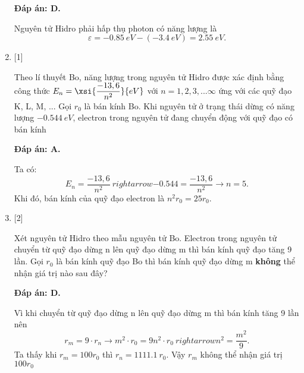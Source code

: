 \begin{enumerate}[label=\bfseries Câu \arabic*:]
	\loigiai
	{		\textbf{Đáp án: D.}
		
		Nguyên tử Hidro phải hấp thụ photon có năng lượng là
		$$
		\varepsilon = \SI{-0,85}{eV} - \left( \SI{-3,4}{eV} \right) = \SI{2,55}{eV}.
		$$	
	}
	
	\item {} [1]
		\cauhoi
	{Theo lí thuyết Bo, năng lượng trong nguyên tử Hidro được xác định bằng công thức $ E_{n} = \xsi{\dfrac{-13,6}{n^{2}}}{eV}$ với $ n = 1, 2, 3, ...\infty $ ứng với các quỹ đạo K, L, M, ... Gọi $ r_{0} $ là bán kính Bo. Khi nguyên tử ở trạng thái dừng có năng lượng $ \SI{-0,544}{eV} $, electron trong nguyên tử đang chuyển động với quỹ đạo có bán kính
	}
	
	\loigiai
	{		\textbf{Đáp án: A.}
		
		Ta có:
		$$
		E_{n} = \dfrac{-13,6}{n^{2}} \ rightarrow \num{-0,544} = \dfrac{-13,6}{n^{2}} \rightarrow n = 5.
		$$		
		Khi đó, bán kính của quỹ đạo electron là $ n^{2} r_{0} = 25 r_{0}$.
	}
	
	\item {} [2]
		\cauhoi
	{Xét nguyên tử Hidro theo mẫu nguyên tử Bo. Electron trong nguyên tử chuyển từ quỹ đạo dừng n lên quỹ đạo dừng m thì bán kính quỹ đạo tăng 9 lần. Gọi $ r_{0} $ là bán kính quỹ đạo Bo thì bán kính quỹ đạo dừng m \textbf{không} thể nhận giá trị nào sau đây?
	}
	
	\loigiai
	{		\textbf{Đáp án: D.}
		
		Vì khi chuyển từ quỹ đạo dừng n lên quỹ đạo dừng m thì bán kính tăng 9 lần nên
		$$
		r_{m} = 9 \cdot r_{n} \rightarrow m^{2} \cdot r_{0} = 9 n^{2} \cdot r_{0} \ rightarrow n^{2} = \dfrac{m^{2}}{9}.
		$$		
		Ta thấy khi $ r_{m} = 100 r_{0} $ thì $ r_{n} = \SI{1111,1}{r_{0}}$.
		Vậy $ r_{m} $ không thể nhận giá trị $ 100 r_{0} $
	}
	

\end{enumerate}
